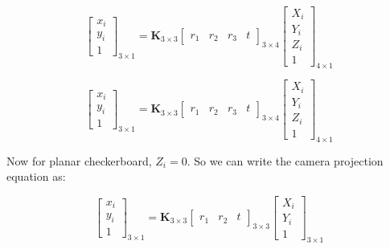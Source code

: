 \documentclass{article}
\begin{document}
\begin{equation}
    \begin{bmatrix}
    x_i \\ y_i \\ 1
    \end{bmatrix}_{3\times1} = \mathbf{K}_{3\times3}
    \begin{bmatrix}
    r_1 & r_2 & r_3 & t
    \end{bmatrix}_{3\times4}
    \begin{bmatrix}
    X_i \\ Y_i \\ Z_i \\1
    \end{bmatrix}_{4\times1}
\end{equation}


\begin{equation}
    \begin{bmatrix}
    x_i \\ y_i \\ 1
    \end{bmatrix}_{3\times1} = \mathbf{K}_{3\times3}
    \begin{bmatrix}
    r_1 & r_2 & r_3 & t
    \end{bmatrix}_{3\times4}
    \begin{bmatrix}
    X_i \\ Y_i \\ Z_i \\1
    \end{bmatrix}_{4\times1}
\end{equation}

Now for planar checkerboard, $Z_i = 0$. So we can write the camera projection equation as:

\begin{equation}
    \begin{bmatrix}
    x_i \\ y_i \\ 1
    \end{bmatrix}_{3\times1} = \mathbf{K}_{3\times3}
    \begin{bmatrix}
    r_1 & r_2 & t
    \end{bmatrix}_{3\times3}
    \begin{bmatrix}
    X_i \\ Y_i \\ 1
    \end{bmatrix}_{3\times1}
\end{equation}
\end{document}
